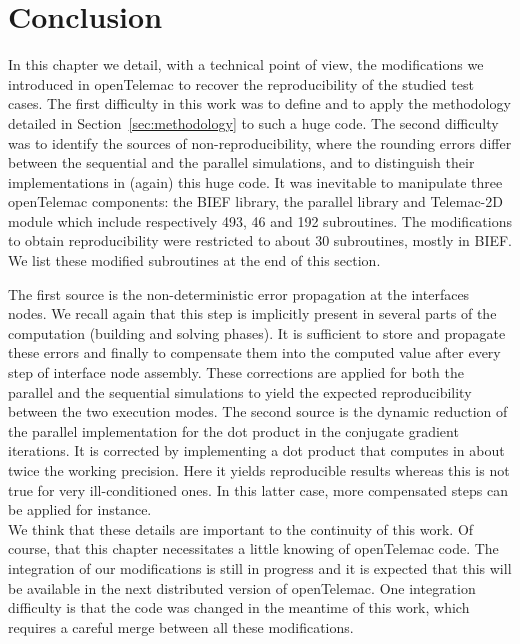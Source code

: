 \section{Conclusion}
%
In this chapter we detail, with a technical point of view, 
the modifications we introduced in openTelemac to recover 
the reproducibility of the studied test cases.
The first difficulty in this work was to define and 
to apply the methodology detailed in Section~\ref{sec:methodology} 
to such a huge code.
The second difficulty was to identify the sources of non-reproducibility, 
\ie where the rounding errors differ between
the sequential and the parallel simulations, and to distinguish
their implementations in (again) this huge code.
%
It was inevitable to manipulate three openTelemac components: 
the BIEF library, the parallel library and Telemac-2D module
which include respectively 493, 46 and 192 subroutines.
The modifications to obtain reproducibility were restricted to 
about 30 subroutines, mostly in BIEF. 
We list these modified subroutines at the end of this section.

The first source is the non-deterministic error propagation at the interfaces nodes. 
We recall again that this step is implicitly present in several parts of the 
computation (building and solving phases).
It is sufficient to store and propagate these errors and finally to
compensate them into the computed value after every step of interface node
assembly.  
These corrections are applied for both the parallel and the
sequential simulations to yield the expected reproducibility
between the two execution modes.      
The second source is the dynamic reduction of the parallel
implementation for the dot product in the conjugate gradient
iterations. It is corrected by implementing a dot product that 
computes in about twice the working precision. 
Here it yields reproducible results whereas this is not true
for very ill-conditioned ones. In this latter case, more compensated 
steps can be applied for instance. \\

We think that these details are important to the continuity of this work.
Of course, that this chapter necessitates a little knowing of openTelemac code.
The integration of our modifications is still in progress and
it is expected that this will be 
available in the next distributed version of openTelemac.
One integration difficulty is that the code 
was changed in the meantime of this work, which requires
a careful merge between all these modifications.
%
